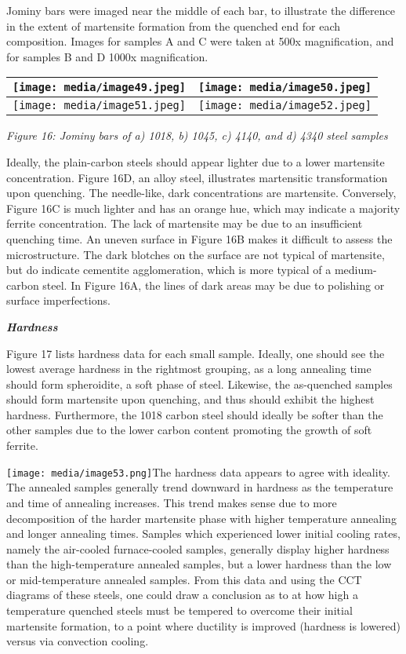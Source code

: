 \documentclass[]{article}
\begin{document}
Jominy bars were imaged near the middle of each bar, to illustrate the
difference in the extent of martensite formation from the quenched end
for each composition. Images for samples A and C were taken at 500x
magnification, and for samples B and D 1000x magnification.

\begin{longtable}[]{@{}ll@{}}
\toprule
\texttt{[image: media/image49.jpeg]} &
\texttt{[image: media/image50.jpeg]}\tabularnewline
\midrule
\endhead
\texttt{[image: media/image51.jpeg]} &
\texttt{[image: media/image52.jpeg]}\tabularnewline
\bottomrule
\end{longtable}

\emph{Figure 16: Jominy bars of a) 1018, b) 1045, c) 4140, and d) 4340
steel samples}

Ideally, the plain-carbon steels should appear lighter due to a lower
martensite concentration. Figure 16D, an alloy steel, illustrates
martensitic transformation upon quenching. The needle-like, dark
concentrations are martensite. Conversely, Figure 16C is much lighter
and has an orange hue, which may indicate a majority ferrite
concentration. The lack of martensite may be due to an insufficient
quenching time. An uneven surface in Figure 16B makes it difficult to
assess the microstructure. The dark blotches on the surface are not
typical of martensite, but do indicate cementite agglomeration, which is
more typical of a medium-carbon steel. In Figure 16A, the lines of dark
areas may be due to polishing or surface imperfections.

\emph{\textbf{Hardness}}

Figure 17 lists hardness data for each small sample. Ideally, one should
see the lowest average hardness in the rightmost grouping, as a long
annealing time should form spheroidite, a soft phase of steel. Likewise,
the as-quenched samples should form martensite upon quenching, and thus
should exhibit the highest hardness. Furthermore, the 1018 carbon steel
should ideally be softer than the other samples due to the lower carbon
content promoting the growth of soft ferrite.

\texttt{[image: media/image53.png]}The
hardness data appears to agree with ideality. The annealed samples
generally trend downward in hardness as the temperature and time of
annealing increases. This trend makes sense due to more decomposition of
the harder martensite phase with higher temperature annealing and longer
annealing times. Samples which experienced lower initial cooling rates,
namely the air-cooled furnace-cooled samples, generally display higher
hardness than the high-temperature annealed samples, but a lower
hardness than the low or mid-temperature annealed samples. From this
data and using the CCT diagrams of these steels, one could draw a
conclusion as to at how high a temperature quenched steels must be
tempered to overcome their initial martensite formation, to a point
where ductility is improved (hardness is lowered) versus via convection
cooling.
\end{document}
